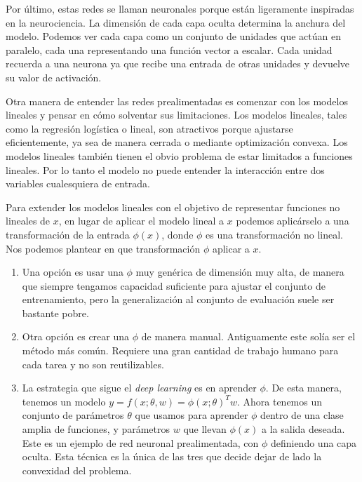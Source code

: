 Por último, estas redes se llaman neuronales porque están ligeramente inspiradas en la neurociencia. La dimensión de cada capa oculta determina la anchura del modelo. Podemos ver cada capa como un conjunto de unidades que actúan en paralelo, cada una representando una función vector a escalar. Cada unidad recuerda a una neurona ya que recibe una entrada de otras unidades y devuelve su valor de activación.

Otra manera de entender las redes prealimentadas es comenzar con los modelos lineales y pensar en cómo solventar sus limitaciones. Los modelos lineales, tales como la regresión logística o lineal, son atractivos porque ajustarse eficientemente, ya sea de manera cerrada o mediante optimización convexa. Los modelos lineales también tienen el obvio problema de estar limitados a funciones lineales. Por lo tanto el modelo no puede entender la interacción entre dos variables cualesquiera de entrada.

Para extender los modelos lineales con el objetivo de representar funciones no lineales de $x$, en lugar de aplicar el modelo lineal a $x$ podemos aplicárselo a una transformación de la entrada $\phi(x)$, donde $\phi$ es una transformación no lineal. Nos podemos plantear en que transformación $\phi$ aplicar a $x$.

\begin{enumerate}
    \item Una opción es usar una $\phi$ muy genérica de dimensión muy alta, de manera que siempre tengamos capacidad suficiente para ajustar el conjunto de entrenamiento, pero la generalización al conjunto de evaluación suele ser bastante pobre.
    
    \item Otra opción es crear una $\phi$ de manera manual. Antiguamente este solía ser el método más común. Requiere una gran cantidad de trabajo humano para cada tarea y no son reutilizables.

    \item La estrategia que sigue el \textit{deep learning} es en aprender $\phi$. De esta manera, tenemos un modelo $y=f(x; \theta, w)=\phi(x;\theta)^Tw$. Ahora tenemos un conjunto de parámetros $\theta$ que usamos para aprender $\phi$ dentro de una clase amplia de funciones, y parámetros $w$ que llevan $\phi(x)$ a la salida deseada. Este es un ejemplo de red neuronal prealimentada, con $\phi$ definiendo una capa oculta. Esta técnica es la única de las tres que decide dejar de lado la convexidad del problema. 
\end{enumerate}

